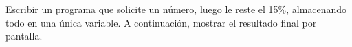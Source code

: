 Escribir un programa que solicite un n\'umero, luego le reste el 15\%, almacenando todo en una \'unica variable. A continuaci\'on, mostrar el resultado final por pantalla.



\volverindice
\newpage
